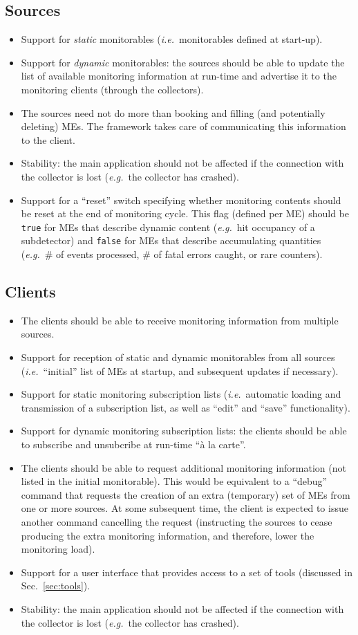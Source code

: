 \documentclass[a4paper]{cmspaper}
\newcommand {\ie}{\mbox{\sl i.e. }}     %
\newcommand {\eg}{\mbox{\sl e.g. }}     %
\begin{document}
\subsection{Sources}
\label{sec:req_sources}
\begin{itemize}
\item{Support for \emph{static} monitorables (\ie monitorables defined
at start-up).}
\item{Support for \emph{dynamic} monitorables: the sources should be able to
update the list of available monitoring information at run-time and
advertise it to the monitoring clients (through the collectors).}
\item{The sources need not do more than booking and filling (and potentially
deleting) MEs. The framework takes care of
communicating this information to the client.}
\item{Stability: the main application should not be affected if the connection
with the collector is lost (\eg the collector has crashed).}
\item{Support for a ``reset'' switch specifying whether monitoring
contents should be reset at the end of monitoring cycle. This flag (defined per
ME) should be {\tt true} for MEs that describe dynamic content (\eg hit
occupancy of a subdetector) and {\tt false} for MEs that describe
accumulating quantities (\eg \# of events processed, \# of fatal
errors caught, or rare counters).}
\end{itemize}
%
%
\subsection{Clients}
\label{sec:req_clients}
\begin{itemize}
\item{The clients should be able to receive monitoring information
from multiple sources.} 
\item{Support for reception of static and dynamic monitorables from all
sources (\ie ``initial'' list of MEs at startup, and
subsequent updates if necessary).}
\item{Support for static monitoring subscription lists (\ie automatic
loading and transmission of a subscription list, as well as ``edit''
and ``save'' functionality).}
\item{Support for dynamic monitoring subscription lists: the clients
should be able to subscribe and unsubcribe at run-time ``\`a la carte''.}
\item{The clients should be able to request additional monitoring
information (not listed in the initial monitorable). This would be
equivalent to a ``debug'' command that requests the creation of an
extra (temporary) set of MEs from one or more
sources. At some subsequent time, the client is expected to issue
another command cancelling the request (instructing the sources to
cease producing the extra monitoring information, and therefore, lower
the monitoring load).} 
\item{Support for a user interface that provides access to a set of
tools (discussed in Sec.~\ref{sec:tools}).}
\item{Stability: the main application should not be affected if the connection
with the collector is lost (\eg the collector has crashed).}
\end{itemize}
%
%
\end{document}
